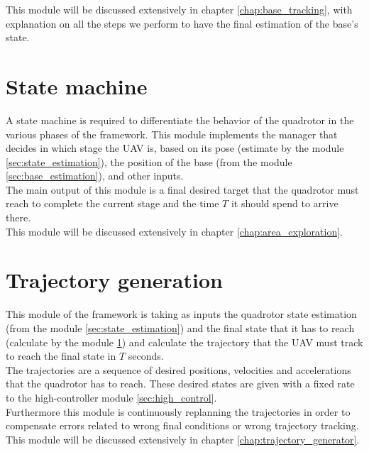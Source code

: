 This module will be discussed extensively in chapter \ref{chap:base_tracking}, with explanation on all the steps we perform to have the final estimation of the base's state.

\section{State machine} \label{sec:area_exploration}
A state machine is required to differentiate the behavior of the quadrotor in the various phases of the framework. This module implements the manager that decides in which stage the UAV is, based on its pose (estimate by the module \ref{sec:state_estimation}), the position of the base (from the module \ref{sec:base_estimation}), and other inputs.\\
The main output of this module is a final desired target that the quadrotor must reach to complete the current stage and the time $T$ it should spend to arrive there.\\

This module will be discussed extensively in chapter \ref{chap:area_exploration}.


\section{Trajectory generation}
This module of the framework is taking as inputs the quadrotor state estimation (from the module \ref{sec:state_estimation}) and the final state that it has to reach (calculate by the module \ref{sec:area_exploration}) and calculate the trajectory that the UAV must track to reach the final state in $T$ seconds.\\
The trajectories are a sequence of desired positions, velocities and accelerations that the quadrotor has to reach. These desired states are given with a fixed rate to the high-controller module \ref{sec:high_control}.\\
Furthermore this module is continuously replanning the trajectories in order to compensate errors related to wrong final conditions or wrong trajectory tracking.\\  

This module will be discussed extensively in chapter \ref{chap:trajectory_generator}.
